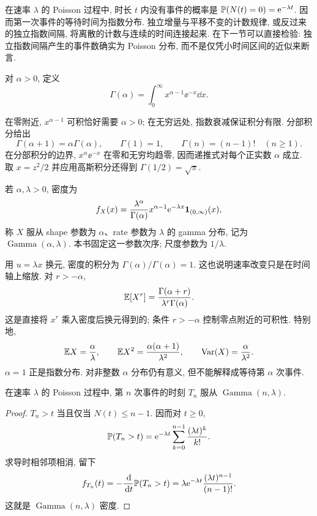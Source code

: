 在速率 $\lambda$ 的 Poisson 过程中, 时长 $t$ 内没有事件的概率是 $\mathbb P(N(t)=0)=\mathrm e^{-\lambda t}$. 因而第一次事件的等待时间为指数分布. 独立增量与平移不变的计数规律, 或反过来的独立指数间隔, 将离散的计数与连续的时间连接起来. 在下一节可以直接检验: 独立指数间隔产生的事件数确实为 Poisson 分布, 而不是仅凭小时间区间的近似来断言.


\begin{definition}[Gamma 函数]
对 $\alpha>0$, 定义
\[
 \Gamma(\alpha)=\int_0^\infty x^{\alpha-1}\ee^{-x}\dd x.
\]
\end{definition}

在零附近, $x^{\alpha-1}$ 可积恰好需要 $\alpha>0$; 在无穷远处, 指数衰减保证积分有限. 分部积分给出
\[
 \Gamma(\alpha+1)=\alpha\Gamma(\alpha),\qquad
 \Gamma(1)=1,\qquad \Gamma(n)=(n-1)!\quad(n\ge1).
\]
在分部积分的边界, $x^\alpha\ee^{-x}$ 在零和无穷均趋零, 因而递推式对每个正实数 $\alpha$ 成立. 取 $x=z^2/2$ 并应用高斯积分还得到 $\Gamma(1/2)=\sqrt\pi$.

\begin{definition}[Gamma 分布]
若 $\alpha,\lambda>0$, 密度为
\[
 f_X(x)=\frac{\lambda^\alpha}{\Gamma(\alpha)}
            x^{\alpha-1}\mathrm e^{-\lambda x}\mathbf 1_{(0,\infty)}(x),
\]
称 $X$ 服从 shape 参数为 $\alpha$、rate 参数为 $\lambda$ 的 gamma 分布, 记为 $\operatorname{Gamma}(\alpha,\lambda)$. 本书固定这一参数次序; 尺度参数为 $1/\lambda$.
\end{definition}

用 $u=\lambda x$ 换元, 密度的积分为 $\Gamma(\alpha)/\Gamma(\alpha)=1$. 这也说明速率改变只是在时间轴上缩放. 对 $r> -\alpha$,
\[
 \mathbb E[X^r]=\frac{\Gamma(\alpha+r)}{\lambda^r\Gamma(\alpha)}.
\]
这是直接将 $x^r$ 乘入密度后换元得到的; 条件 $r> -\alpha$ 控制零点附近的可积性. 特别地,
\[
 \mathbb E X=\frac\alpha\lambda,\qquad
 \mathbb E X^2=\frac{\alpha(\alpha+1)}{\lambda^2},\qquad
 \operatorname{Var}(X)=\frac\alpha{\lambda^2}.
\]
$\alpha=1$ 正是指数分布. 对非整数 $\alpha$ 分布仍有意义, 但不能解释成等待第 $\alpha$ 次事件.

\begin{proposition}
在速率 $\lambda$ 的 Poisson 过程中, 第 $n$ 次事件的时刻 $T_n$ 服从 $\operatorname{Gamma}(n,\lambda)$.
\end{proposition}
\begin{proof}
$T_n>t$ 当且仅当 $N(t)\le n-1$. 因而对 $t\ge0$,
\[
 \mathbb P(T_n>t)=\mathrm e^{-\lambda t}
       \sum_{k=0}^{n-1}\frac{(\lambda t)^k}{k!}.
\]
求导时相邻项相消, 留下
\[
 f_{T_n}(t)=-\frac{\,\mathrm d}{\,\mathrm d t}\mathbb P(T_n>t)
 =\lambda\mathrm e^{-\lambda t}\frac{(\lambda t)^{n-1}}{(n-1)!}.
\]
这就是 $\operatorname{Gamma}(n,\lambda)$ 密度.
\end{proof}


